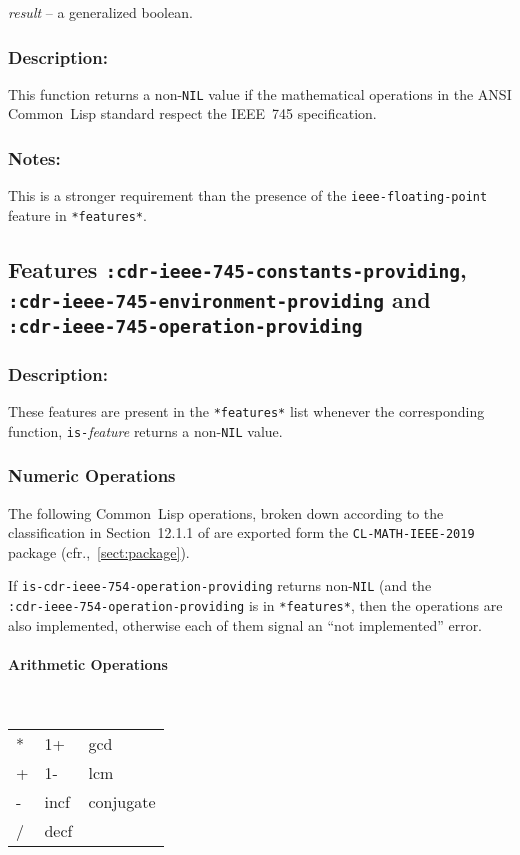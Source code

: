 \documentclass[10pt,fleqn]{article}
\newcommand{\CL}{\textsf{Common~Lisp}}
\newcommand{\code}[1]{\texttt{#1}}
\newcommand{\varname}[1]{\textit{#1}}
\newcommand{\DDictionaryItem}[1]{\vspace*{6pt}\noindent\hrulefill\vspace*{-9pt}\subsection*{#1}}
\newcommand{\DDescription}{\subsubsection*{Description:}}
\newcommand{\DNotes}{\subsubsection*{Notes:}}
\begin{document}
\varname{result} -- a generalized boolean.


\DDescription{}

This function returns a non-\code{NIL} value if the mathematical
operations in the ANSI \CL{} standard \cite{ANSIHyperSpec} respect the
IEEE~745 specification.

\DNotes{}

This is a stronger requirement than the
presence of the \code{ieee-floating-point} feature in
\code{*features*}.


\DDictionaryItem{Features \code{:cdr-ieee-745-constants-providing},\\
  \code{:cdr-ieee-745-environment-providing} and\\
  \code{:cdr-ieee-745-operation-providing}}

\DDescription{}

These features are present in the \code{*features*} list whenever the
corresponding function, \code{is-}\emph{feature} returns a
non-\code{NIL} value.

\subsubsection{Numeric Operations}

The following \CL{} operations, broken down according to the
classification in Section~12.1.1 of \cite{ANSIHyperSpec} are exported
form the \code{CL-MATH-IEEE-2019} package
(cfr.,~\ref{sect:package}).

If \code{is-cdr-ieee-754-operation-providing} returns non-\code{NIL}
(and the\\ \code{:cdr-ieee-754-operation-providing} is in
\code{*features*}, then the operations are also implemented, otherwise
each of them signal an ``not implemented'' error.

\paragraph{Arithmetic Operations} ~\\

\begin{tt}
  \begin{tabular}{lll}
    * & 1+ & gcd\\
    + & 1- & lcm\\
    - & incf & conjugate\\
    / & decf & {\ }\\
  \end{tabular}
\end{tt}
\end{document}
